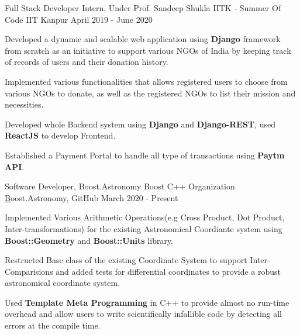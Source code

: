 \begin{cventries}
    
    \cventry
    {Full Stack Developer Intern, Under Prof. Sandeep Shukla}
    {IITK - Summer Of Code}
    {IIT Kanpur}
    {April 2019 - June 2020}
    {
      \begin{cvitems}
        \item {Developed a dynamic and scalable web application using \textbf{Django} framework from scratch as an initiative to support various NGOs of India by keeping track of records of users and their donation history.}
        \item{Implemented various functionalities that allows registered users to choose from various NGOs to donate, as well as the registered NGOs	to list their mission and necessities.}
        \item{Developed whole Backend system using \textbf{Django} and \textbf{Django-REST}, used \textbf{ReactJS} to develop Frontend.}
        \item{Established a Payment Portal to handle all type of transactions using \textbf{Paytm API}.}
      \end{cvitems}
    }
        
    \cventry
    {Software Developer, Boost.Astronomy}
    {Boost C++ Organization}
    {\href{https://github.com/BoostGSoC19/astronomy}Boost.Astronomy, GitHub}
    {March 2020 - Present}
    {
      \begin{cvitems}
        \item {Implemented Various Arithmetic Operations(e.g Cross Product, Dot Product, Inter-transformations) for the  existing Astronomical Coordiante system using \textbf{Boost::Geometry} and \textbf{Boost::Units} library.}
        \item {Restructed Base class of the existing Coordinate System to support Inter-Comparisions and added tests for differential coordinates to provide a robust astronomical coordinate system.}
        \item{Used \textbf{Template Meta Programming} in C++ to provide almost no run-time overhead and allow users to write scientifically infallible code by detecting all errors at the compile time.}
      \end{cvitems}
    }
  
  
\end{cventries}
